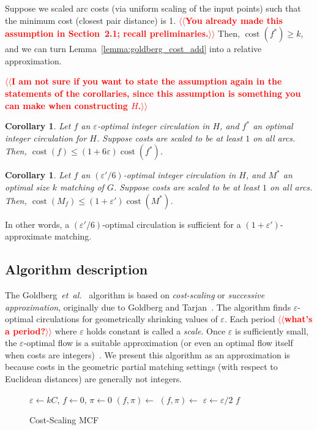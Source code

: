 \documentclass[11pt]{article}
\makeatletter
\def\etal{\textsl{et~al.}}
\def\eps{\varepsilon}
\theoremstyle{plain}
\newtheorem{corollary}[lemma]{Corollary}
\numberwithin{figure}{section}
\def\cost{\operatorname{cost}}
\def\n@te#1{\textsf{\boldmath \textbf{$\langle\!\langle$#1$\rangle\!\rangle$}}\leavevmode}
\def\note#1{\textcolor{red}{\n@te{#1}}}
\makeatother
\begin{document}
Suppose we scaled arc costs (via uniform scaling of the input points) such that
the minimum cost (closest pair distance) is 1. \note{You already made this assumption in Section~2.1; recall preliminaries.}
Then, $\cost(f^*) \geq k$, and we can turn Lemma~\ref{lemma:goldberg_cost_add}
into a relative approximation.

\note{I am not sure if you want to state the assumption again in the statements of the corollaries, since this assumption is something you can make when constructing $H$.}

\begin{corollary}
\label{corollary:flow_approx}
Let $f$ an $\eps$-optimal integer circulation in $H$, and $f^*$ an optimal
integer circulation for $H$.
Suppose costs are scaled to be at least $1$ on all arcs.
Then, $\cost(f) \leq (1 + 6\eps) \cost(f^*)$.
\end{corollary}

\begin{corollary}
\label{corollary:match_approx}
Let $f$ an $(\eps'/6)$-optimal integer circulation in $H$, and $M^*$ an optimal
size $k$ matching of $G$.
Suppose costs are scaled to be at least $1$ on all arcs.
Then, $\cost(M_f) \leq (1 + \eps') \cost(M^*)$.
\end{corollary}

In other words, a $(\eps'/6)$-optimal circulation is sufficient for a
$(1 + \eps')$-approximate matching.

\subsection{Algorithm description}

The Goldberg~{\etal}~\cite{GHKT17} algorithm is based on \emph{cost-scaling} or
\emph{successive approximation}, originally due to Goldberg and
Tarjan~\cite{GT90}.
The algorithm finds $\eps$-optimal circulations for geometrically shrinking
values of $\eps$.
Each period \note{what's a period?} where $\eps$ holds constant is called a \emph{scale}.
Once $\eps$ is sufficiently small, the $\eps$-optimal flow is a suitable
approximation (or even an optimal flow itself when costs are integers)~\cite{GT90,GHKT17}.
We present this algorithm as an approximation is because costs in the geometric
partial matching settings (with respect to Euclidean distances) are generally not integers.

\begin{figure*}[h]
\centering
\begin{minipage}{.5\linewidth}
\begin{algorithm}[H]
\caption{Cost-Scaling MCF}
\begin{algorithmic}[1]
\Function{MCF}{$H$, $\eps^*$}
	\State $\eps \gets kC$,
	$f \gets 0$,
	$\pi \gets 0$
	\While{$\eps > \eps^*/6$}
		\State $(f, \pi) \gets$ 
		\State $(f, \pi) \gets$ 
		\State $\eps \gets \eps/2$
	\EndWhile
	\State\Return $f$
\EndFunction
\end{algorithmic}
\end{algorithm}
\end{minipage}
\end{figure*}
\end{document}
